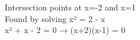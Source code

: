 \documentclass[preview]{standalone}
\begin{document}
\begin{center}
Intersection points at x=-2 and x=1\\Found by solving x² = 2 - x\\x² + x - 2 = 0 → (x+2)(x-1) = 0
\end{center}
\end{document}

